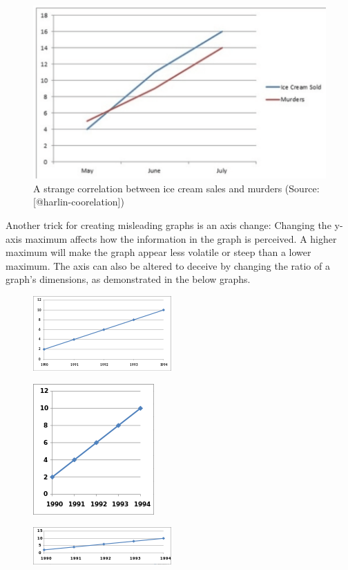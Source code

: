 \documentclass[]{book}
\theoremstyle{definition}
\theoremstyle{definition}
\theoremstyle{definition}
\theoremstyle{remark}
\begin{document}
\begin{figure}
\includegraphics[width=0.7\linewidth]{images/harlin-ice-cream} \caption{A strange correlation between ice cream sales and murders (Source: [@harlin-coorelation])}\label{fig:harlin-ice-cream}
\end{figure}

Another trick for creating misleading graphs is an axis change: Changing
the y-axis maximum affects how the information in the graph is
perceived. A higher maximum will make the graph appear less volatile or
steep than a lower maximum. The axis can also be altered to deceive by
changing the ratio of a graph's dimensions, as demonstrated in the below
graphs.

\begin{figure}
\centering
\includegraphics{images/Line_graph1.svg.png}
\caption{}
\end{figure}

\begin{figure}
\centering
\includegraphics{images/175px-Line_graph1-3.svg.png}
\caption{}
\end{figure}

\begin{figure}
\centering
\includegraphics{images/200px-Line_graph1-4.svg.png}
\caption{}
\end{figure}
\end{document}
